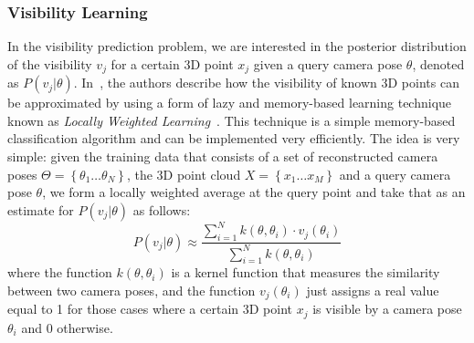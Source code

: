 \subsubsection{Visibility Learning}\label{sec:visibility}
In the visibility prediction problem, we are interested in the posterior distribution of the visibility $v_{j}$ for a certain 3D point $x_{j}$ given a query camera pose $\theta$, denoted as $P(v_{j} \vert \theta)$. In~\cite{Alcantarilla11icra}, the authors describe how the visibility of known 3D points can be approximated by using a form of lazy and memory-based learning technique known as \textit{Locally Weighted Learning}~\cite{Atkeson97ai}. This technique is a simple memory-based classification algorithm and can be implemented very efficiently. The idea is very simple: given the training data that
consists of a set of reconstructed camera poses $\Theta = \left\{\theta_1 \ldots \theta_N \right\}$, the 3D point cloud $X = \left\{x_1 \ldots x_M\right\}$ and a query camera pose $\theta$, we
form a locally weighted average at the query point and take that as an estimate for $P(v_{j} \vert \theta)$ as follows:
%
\begin{equation} \label{eq:locally_weighted}
 P(v_j \vert \theta) \approx \frac{\sum\limits_{i=1}^{N} k(\theta,\theta_{i})\cdot v_j(\theta_i)}{\sum\limits_{i=1}^{N} k(\theta,\theta_{i})}
\end{equation}
% 
where the function $k(\theta,\theta_{i})$ is a kernel function that measures the similarity between two camera poses, and the function $v_{j}(\theta_i)$ just assigns a real value equal to 1 for those cases
where a certain 3D point $x_{j}$ is visible by a camera pose $\theta_{i}$ and 0 otherwise.

